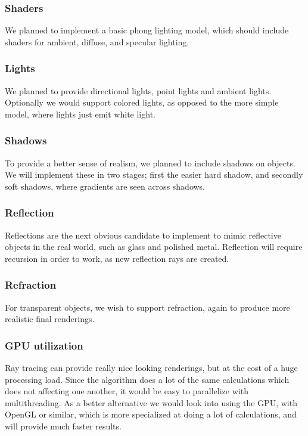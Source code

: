 \subsubsection{Shaders}
We planned to implement a basic phong lighting model, which should include shaders for ambient, diffuse, and specular lighting. 

\subsubsection{Lights}
We planned to provide directional lights, point lights and ambient lights. Optionally we would support colored lights, as opposed to the more simple model, where lights just emit white light. 

\subsubsection{Shadows}
To provide a better sense of realism, we planned to include shadows on objects. We will implement these in two stages; first the easier hard shadow, and secondly soft shadows, where gradients are seen across shadows. 

\subsubsection{Reflection}
Reflections are the next obvious candidate to implement to mimic reflective objects in the real world, such as glass and polished metal. Reflection will require recursion in order to work, as new reflection rays are created.

\subsubsection{Refraction}
For transparent objects, we wish to support refraction, again to produce more realistic final renderings. 

\subsubsection{GPU utilization}
Ray tracing can provide really nice looking renderings, but at the cost of a huge processing load. Since the algorithm does a lot of the same calculations which does not affecting one another, it would be easy to parallelize with multithreading. As a better alternative we would look into using the GPU, with OpenGL or similar, which is more specialized at doing a lot of calculations, and will provide much faster results.

